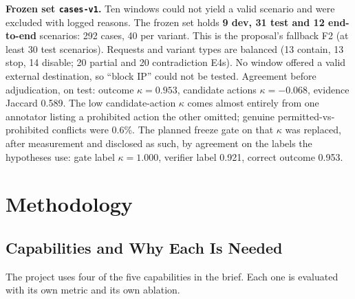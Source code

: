\documentclass[11pt,a4paper]{article}
\newcommand{\code}[1]{\texttt{\small #1}}
\begin{document}
\textbf{Frozen set \code{cases-v1}.} Ten windows could not yield a valid scenario and were excluded with logged reasons. The frozen set holds \textbf{9 dev, 31 test and 12 end-to-end} scenarios: 292 cases, 40 per variant. This is the proposal's fallback F2 (at least 30 test scenarios). Requests and variant types are balanced (13 contain, 13 stop, 14 disable; 20 partial and 20 contradiction E4s). No window offered a valid external destination, so ``block IP'' could not be tested. Agreement before adjudication, on test: outcome $\kappa=0.953$, candidate actions $\kappa=-0.068$, evidence Jaccard 0.589. The low candidate-action $\kappa$ comes almost entirely from one annotator listing a prohibited action the other omitted; genuine permitted-vs-prohibited conflicts were 0.6\%. The planned freeze gate on that $\kappa$ was replaced, after measurement and disclosed as such, by agreement on the labels the hypotheses use: gate label $\kappa=1.000$, verifier label 0.921, correct outcome 0.953.

\section{Methodology}
\subsection{Capabilities and Why Each Is Needed}
The project uses four of the five capabilities in the brief. Each one is evaluated with its own metric and its own ablation.
\end{document}
